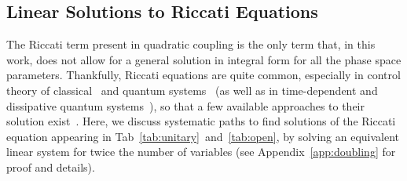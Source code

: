 \documentclass[%
reprint,
superscriptaddress,
nofootinbib,
 amsmath,amssymb,
prx,
floatfix,
]{revtex4-2}
\begin{document}

\subsection{Linear Solutions to Riccati Equations \label{subsec:riccati}}

The Riccati term present in quadratic coupling is the only term that, in this work, does not allow for a general solution in integral form for all the phase space parameters. Thankfully, Riccati equations are quite common, especially in control theory of classical~\cite{Kalman_new_1960,AbouKandil2003} and quantum systems~\cite{wiseman_optimal_2005,wiseman_quantum_2010,serafini_quantum_2017} (as well as in time-dependent and dissipative quantum systems~\cite{CRUZ201544,CRUZ2016609,Schuch2018}),
so that a few available approaches to their solution exist~\cite{Bini2012,blanco_interplay_2019}. Here, we discuss systematic paths to find solutions of the Riccati equation appearing in Tab~\ref{tab:unitary}~and~\ref{tab:open}, by solving an equivalent linear system for twice the number of variables (see Appendix~\ref{app:doubling} for proof and details). 
\end{document}
